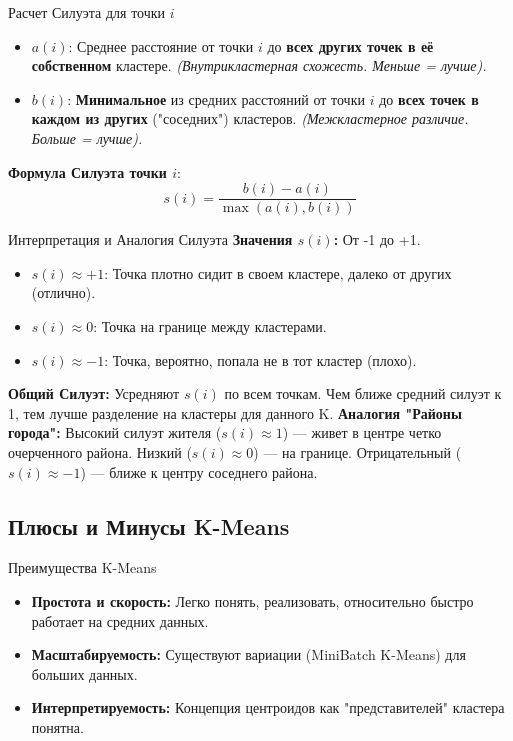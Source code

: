\begin{myblock}{Расчет Силуэта для точки $i$}
    \begin{itemize}[nosep, leftmargin=*]
        \item $a(i)$: Среднее расстояние от точки $i$ до \textbf{всех других точек в её собственном} кластере. \textit{(Внутрикластерная схожесть. Меньше = лучше).}
        \item $b(i)$: \textbf{Минимальное} из средних расстояний от точки $i$ до \textbf{всех точек в каждом из других} ("соседних") кластеров. \textit{(Межкластерное различие. Больше = лучше).}
    \end{itemize}
    \textbf{Формула Силуэта точки $i$}: \[ s(i) = \frac{b(i) - a(i)}{\max(a(i), b(i))} \]
\end{myblock}

\begin{myexampleblock}{Интерпретация и Аналогия Силуэта}
    \textbf{Значения $s(i)$:} От -1 до +1.
    \begin{itemize}[nosep, leftmargin=*]
        \item $s(i) \approx +1$: Точка плотно сидит в своем кластере, далеко от других (отлично).
        \item $s(i) \approx 0$: Точка на границе между кластерами.
        \item $s(i) \approx -1$: Точка, вероятно, попала не в тот кластер (плохо).
    \end{itemize}
    \textbf{Общий Силуэт:} Усредняют $s(i)$ по всем точкам. Чем ближе средний силуэт к 1, тем лучше разделение на кластеры для данного K.
    \vspace{0.5ex}
    \textbf{Аналогия "Районы города":} Высокий силуэт жителя ($s(i) \approx 1$) — живет в центре четко очерченного района. Низкий ($s(i) \approx 0$) — на границе. Отрицательный ($s(i) \approx -1$) — ближе к центру соседнего района.
\end{myexampleblock}

\subsection{Плюсы и Минусы K-Means}
\begin{textbox}{Преимущества K-Means}
    \begin{itemize}[nosep, leftmargin=*]
        \item \textbf{Простота и скорость:} Легко понять, реализовать, относительно быстро работает на средних данных.
        \item \textbf{Масштабируемость:} Существуют вариации (MiniBatch K-Means) для больших данных.
        \item \textbf{Интерпретируемость:} Концепция центроидов как "представителей" кластера понятна.
    \end{itemize}
\end{textbox}

